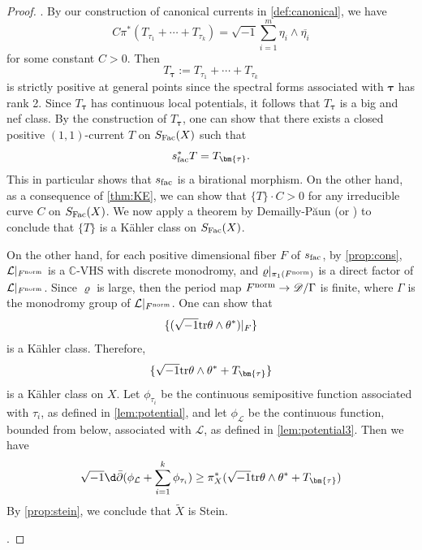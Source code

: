 \documentclass[english]{amsproc}
\theoremstyle{plain}
\theoremstyle{definition}
\theoremstyle{remark}
\theoremstyle{plain}
\numberwithin{equation}{thm} %
\newcommand{\sD}{\mathscr{D}}
\newcommand{\cL}{\mathcal L}
\newcommand{\bC}{\mathbb{C}}
\newcommand{\bF}{\mathbb{F}}
\def\db{\bar{\partial}}
\def\sn{\sqrt{-1}}
\def\btau{{\bm{\tau}}}
\newcommand{\GL}{{\rm GL}}
\begin{document}
\begin{proof}
	\medspace
	
	.   By our construction of canonical currents in \cref{def:canonical}, we have
	$$
	C\pi^*(T_{\tau_1}+\cdots+T_{\tau_k})=\sn\sum_{i=1}^{m} \eta_i\wedge\overline{\eta_i}
	$$
	for some constant $C>0$. 
	Then 
	$$T_\btau:=T_{\tau_1}+\cdots+T_{\tau_k}$$ is strictly positive at general points since the spectral forms associated with $\btau$ has rank 2. Since $T_\btau$ has continuous local potentials, it follows that $T_\btau$  is a  big and nef class.   By the construction of $T_\btau$, one can show that there exists a closed positive $(1,1)$-current $T$ on $S_{\rm Fac}(X)$ such that 
	$$
	s_{\rm fac}^*T=T_\btau. 
	$$
	This in particular shows that $s_{\rm fac}$ is a birational morphism. 
	On the other hand, as a consequence of \cref{thm:KE}, we can show that  $\{T\}\cdot C>0$ for any irreducible curve $C$ on $S_{\rm Fac}(X)$. 	  
	We now apply a theorem by Demailly-P\u{a}un \cite{DP04} (or \cite{Lam99}) to  conclude that $\{T\}$ is a K\"ahler class on $S_{\rm Fac}(X)$.   
	
	On the other hand,  for each positive dimensional fiber $F$ of $s_{\rm fac}$, by \cref{prop:cons}, $\cL|_{F^{\rm norm}}$ is a $\bC$-VHS with discrete monodromy, and $\varrho|_{\pi_1(F^{\rm norm})}$ is a direct factor of  $\cL|_{F^{\rm norm}}$. Since $\varrho$ is large, then the period map $F^{\rm norm}\to \sD/\Gamma$ is finite, where $\Gamma$ is the monodromy group of $\cL|_{F^{\rm norm}}$. One can show that
	$$
	\{(	 	\sn {\rm tr}\theta\wedge\theta^*)|_{F}\}
	$$  
	is a K\"ahler class. Therefore,
	$$
	\{	\sn {\rm tr}\theta\wedge\theta^*+T_{\btau}\} 
	$$
	is a K\"ahler class on  $X$.  Let $\phi_{\tau_i}$ be the continuous semipositive function associated with $\tau_i$, as defined in \cref{lem:potential}, and let $\phi_{\cL}$ be the continuous function, bounded from below, associated with $\cL$, as defined in \cref{lem:potential3}.
	   Then we have  
	$$
\sn\d\db(\phi_\cL+\sum_{i=1}^{k}\phi_{\tau_i}) \geq 	\pi_X^*(\sn {\rm tr}\theta\wedge\theta^*+T_{\btau})
	$$
	By \cref{prop:stein}, we conclude that $\widetilde{X}$ is Stein.  
	
	\medspace
	
	
	
	
	. 
	

\end{proof}
\end{document}
